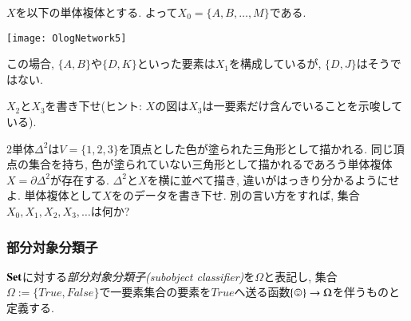 \begin{exercise}
$X$を以下の単体複体とする. よって$X_0=\{A,B,\ldots,M\}$である.
\begin{center}
\texttt{[image: OlogNetwork5]}
\end{center} 
この場合, $\{A,B\}$や$\{D,K\}$といった要素は$X_1$を構成しているが, $\{D,J\}$はそうではない.

$X_2$と$X_3$を書き下せ(ヒント: $X$の図は$X_3$は一要素だけ含んでいることを示唆している).
\end{exercise}

\begin{exercise}
2単体$\Delta^2$は$V=\{1,2,3\}$を頂点とした色が塗られた三角形として描かれる. 同じ頂点の集合を持ち, 色が塗られていない三角形として描かれるであろう単体複体$X=\partial\Delta^2$が存在する.
\sexc $\Delta^2$と$X$を横に並べて描き, 違いがはっきり分かるようにせよ.
\next 単体複体として$X$をのデータを書き下せ. 別の言い方をすれば, 集合$X_0, X_1, X_2, X_3,\ldots$は何か?
\endsexc
\end{exercise}


\subsubsection{部分対象分類子}

\begin{definition}\label{def:subobject classifier}


$\mathbf{Set}$に対する\emph{部分対象分類子(subobject classifier)}を$\Omega$と表記し, 集合$\Omega:=\{\mathit{True},\mathit{False}\}$で一要素集合の要素を$\mathit{True}$へ送る函数$\singleton\to\Omega$を伴うものと定義する. 

\end{definition}


